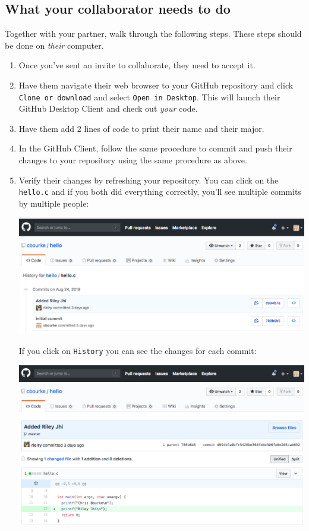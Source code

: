 \documentclass[12pt]{scrartcl}
\begin{document}
\subsection{What your collaborator needs to do}

Together with your partner, walk through the following steps.  These
steps should be done on \emph{their} computer.

\begin{enumerate}
  \item Once you've sent an invite to collaborate, they need to accept it.
  \item Have them navigate their web browser to your GitHub 
  repository and click \texttt{Clone or download} and select
  \texttt{Open in Desktop}.  This will launch their GitHub
  Desktop Client and check out \emph{your} code.
  \item Have them add 2 lines of code to print their name and their major.
  \item In the GitHub Client, follow the same procedure to commit and push
  their changes to your repository using the same procedure as above.
  \item Verify their changes by refreshing your repository.  You can click
  on the \texttt{hello.c} and if you both did everything correctly, 
  you'll see multiple commits by multiple people:
  \begin{center}
  \includegraphics[scale=0.25]{./hack1.0-files/completedRepo02.png}
  \end{center}
  If you click on \texttt{History} you can see the changes for
  each commit: 
  \begin{center}
  \includegraphics[scale=0.25]{./hack1.0-files/completedRepo03.png}
  \end{center}

\end{enumerate}
\end{document}
